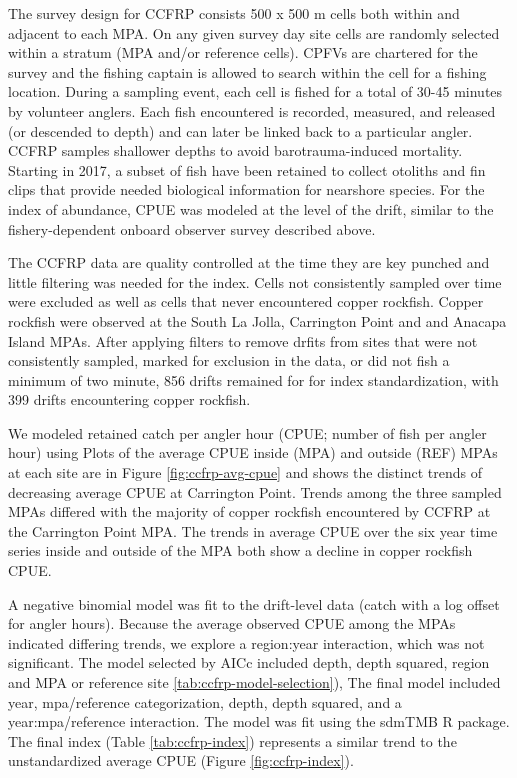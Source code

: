 \documentclass[11pt,
  english,
  letterpaper,
]{article}
\begin{document}
The survey design for CCFRP consists 500 x 500 m cells both within and adjacent to each MPA. On any given survey day site cells are randomly selected within a stratum (MPA and/or reference cells). CPFVs are chartered for the survey and the fishing captain is allowed to search within the cell for a fishing location. During a sampling event, each cell is fished for a total of 30-45 minutes by volunteer anglers. Each fish encountered is recorded, measured, and released (or descended to depth) and can later be linked back to a particular angler. CCFRP samples shallower depths to avoid barotrauma-induced mortality. Starting in 2017, a subset of fish have been retained to collect otoliths and fin clips that provide needed biological information for nearshore species. For the index of abundance, CPUE was modeled at the level of the drift, similar to the fishery-dependent onboard observer survey described above.

The CCFRP data are quality controlled at the time they are key punched and little filtering was needed for the index. Cells not consistently sampled over time were excluded as well as cells that never encountered copper rockfish. Copper rockfish were observed at the South La Jolla, Carrington Point and and Anacapa Island MPAs. After applying filters to remove drfits from sites that were not consistently sampled, marked for exclusion in the data, or did not fish a minimum of two minute, 856 drifts remained for for index standardization, with 399 drifts encountering copper rockfish.

We modeled retained catch per angler hour (CPUE; number of fish per angler hour) using Plots of the average CPUE inside (MPA) and outside (REF) MPAs at each site are in Figure \ref{fig:ccfrp-avg-cpue} and shows the distinct trends of decreasing average CPUE at Carrington Point. Trends among the three sampled MPAs differed with the majority of copper rockfish encountered by CCFRP at the Carrington Point MPA. The trends in average CPUE over the six year time series inside and outside of the MPA both show a decline in copper rockfish CPUE.

A negative binomial model was fit to the drift-level data (catch with a log offset for angler hours). Because the average observed CPUE among the MPAs indicated differing trends, we explore a region:year interaction, which was not significant. The model selected by AICc included depth, depth squared, region and MPA or reference site \ref{tab:ccfrp-model-selection}), The final model included year, mpa/reference categorization, depth, depth squared, and a year:mpa/reference interaction. The model was fit using the sdmTMB R package. The final index (Table \ref{tab:ccfrp-index}) represents a similar trend to the unstandardized average CPUE (Figure \ref{fig:ccfrp-index}).
\end{document}

